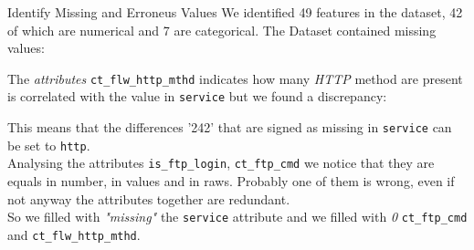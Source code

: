 \documentclass[12pt,aspectratio=169,notheorems]{beamer}
\begin{document}
\begin{frame}{Identify Missing and Erroneus Values }
        \scriptsize 
        We identified 49 features in the dataset, 42 of which are numerical and 7 are categorical.
        The Dataset contained missing values: 
        \begin{table}[]
            \centering
        \end{table}        
        The \emph{attributes }\texttt{ct\_flw\_http\_mthd} indicates how many \emph{HTTP} method are present is correlated with 
        the value  in \texttt{service} but we found a discrepancy:
        \begin{table}[]
            \centering
        \end{table}
        This means that the differences '242' that are signed as missing in \texttt{service} can be set to \texttt{http}.  \\
        \vspace{2ex}
        Analysing the attributes \texttt{is\_ftp\_login}, \texttt{ct\_ftp\_cmd} we notice that they are equals in number, in values and in raws.  
        Probably one of them is wrong, even if not anyway the attributes together are redundant.
        \vspace{2ex}\\
        So we filled with \emph{"missing"} the \texttt{service} attribute and we filled with \emph{0} \texttt{ct\_ftp\_cmd} and \texttt{ct\_flw\_http\_mthd}.
\end{frame}
\end{document}
